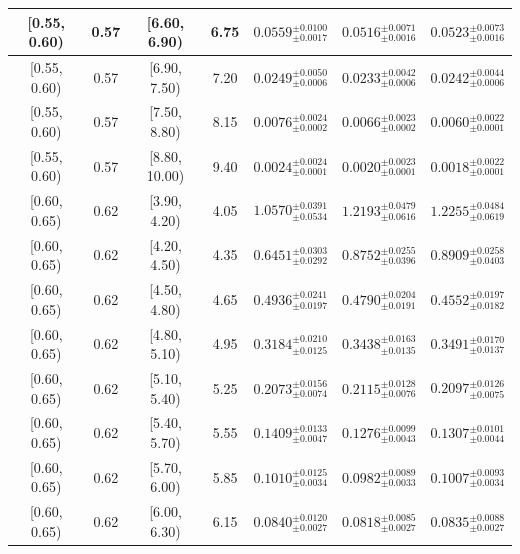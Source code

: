 \begin{longtable}{|c|c|c|c|c|c|c|}
\hline
[0.55, 0.60) & 0.57 & [6.60, 6.90) & 6.75 & $0.0559^{ \pm 0.0100 }_{ \pm 0.0017 }$ & $0.0516^{ \pm 0.0071 }_{ \pm 0.0016 }$ & $0.0523^{ \pm 0.0073 }_{ \pm 0.0016 }$ \\ 
\hline
[0.55, 0.60) & 0.57 & [6.90, 7.50) & 7.20 & $0.0249^{ \pm 0.0050 }_{ \pm 0.0006 }$ & $0.0233^{ \pm 0.0042 }_{ \pm 0.0006 }$ & $0.0242^{ \pm 0.0044 }_{ \pm 0.0006 }$ \\ 
\hline
[0.55, 0.60) & 0.57 & [7.50, 8.80) & 8.15 & $0.0076^{ \pm 0.0024 }_{ \pm 0.0002 }$ & $0.0066^{ \pm 0.0023 }_{ \pm 0.0002 }$ & $0.0060^{ \pm 0.0022 }_{ \pm 0.0001 }$ \\ 
\hline
[0.55, 0.60) & 0.57 & [8.80, 10.00) & 9.40 & $0.0024^{ \pm 0.0024 }_{ \pm 0.0001 }$ & $0.0020^{ \pm 0.0023 }_{ \pm 0.0001 }$ & $0.0018^{ \pm 0.0022 }_{ \pm 0.0001 }$ \\ 
\hline
[0.60, 0.65) & 0.62 & [3.90, 4.20) & 4.05 & $1.0570^{ \pm 0.0391 }_{ \pm 0.0534 }$ & $1.2193^{ \pm 0.0479 }_{ \pm 0.0616 }$ & $1.2255^{ \pm 0.0484 }_{ \pm 0.0619 }$ \\ 
\hline
[0.60, 0.65) & 0.62 & [4.20, 4.50) & 4.35 & $0.6451^{ \pm 0.0303 }_{ \pm 0.0292 }$ & $0.8752^{ \pm 0.0255 }_{ \pm 0.0396 }$ & $0.8909^{ \pm 0.0258 }_{ \pm 0.0403 }$ \\ 
\hline
[0.60, 0.65) & 0.62 & [4.50, 4.80) & 4.65 & $0.4936^{ \pm 0.0241 }_{ \pm 0.0197 }$ & $0.4790^{ \pm 0.0204 }_{ \pm 0.0191 }$ & $0.4552^{ \pm 0.0197 }_{ \pm 0.0182 }$ \\ 
\hline
[0.60, 0.65) & 0.62 & [4.80, 5.10) & 4.95 & $0.3184^{ \pm 0.0210 }_{ \pm 0.0125 }$ & $0.3438^{ \pm 0.0163 }_{ \pm 0.0135 }$ & $0.3491^{ \pm 0.0170 }_{ \pm 0.0137 }$ \\ 
\hline
[0.60, 0.65) & 0.62 & [5.10, 5.40) & 5.25 & $0.2073^{ \pm 0.0156 }_{ \pm 0.0074 }$ & $0.2115^{ \pm 0.0128 }_{ \pm 0.0076 }$ & $0.2097^{ \pm 0.0126 }_{ \pm 0.0075 }$ \\ 
\hline
[0.60, 0.65) & 0.62 & [5.40, 5.70) & 5.55 & $0.1409^{ \pm 0.0133 }_{ \pm 0.0047 }$ & $0.1276^{ \pm 0.0099 }_{ \pm 0.0043 }$ & $0.1307^{ \pm 0.0101 }_{ \pm 0.0044 }$ \\ 
\hline
[0.60, 0.65) & 0.62 & [5.70, 6.00) & 5.85 & $0.1010^{ \pm 0.0125 }_{ \pm 0.0034 }$ & $0.0982^{ \pm 0.0089 }_{ \pm 0.0033 }$ & $0.1007^{ \pm 0.0093 }_{ \pm 0.0034 }$ \\ 
\hline
[0.60, 0.65) & 0.62 & [6.00, 6.30) & 6.15 & $0.0840^{ \pm 0.0120 }_{ \pm 0.0027 }$ & $0.0818^{ \pm 0.0085 }_{ \pm 0.0027 }$ & $0.0835^{ \pm 0.0088 }_{ \pm 0.0027 }$ \\ 
\hline

\end{longtable}

